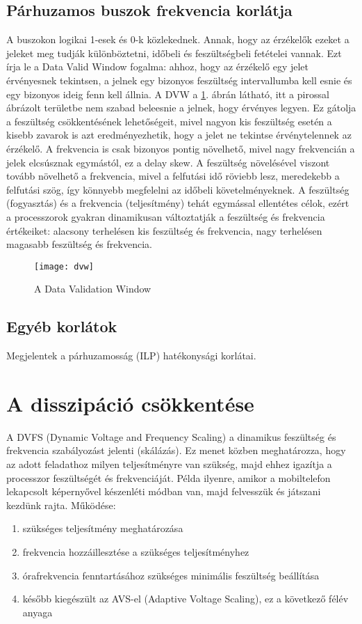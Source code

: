 \subsection{Párhuzamos buszok frekvencia korlátja}
A buszokon logikai 1-esek és 0-k közlekednek. Annak, hogy az érzékelők ezeket a jeleket meg tudják különböztetni, időbeli és feszültségbeli fetételei vannak.
Ezt írja le a Data Valid Window fogalma: ahhoz, hogy az érzékelő egy jelet érvényesnek tekintsen, a jelnek egy bizonyos feszültség intervallumba kell esnie és egy bizonyos ideig fenn kell állnia.
A DVW a \ref{fig:dvw}. ábrán látható, itt a pirossal ábrázolt területbe nem szabad beleesnie a jelnek, hogy érvényes legyen.
Ez gátolja a feszültség csökkentésének lehetőségeit, mivel nagyon kis feszültség esetén a kisebb zavarok is azt eredményezhetik, hogy a jelet ne tekintse érvénytelennek az érzékelő.
A frekvencia is csak bizonyos pontig növelhető, mivel nagy frekvencián a jelek elcsúsznak egymástól, ez a delay skew.
A feszültség növelésével viszont tovább növelhető a frekvencia, mivel a felfutási idő röviebb lesz, meredekebb a felfutási szög, így könnyebb megfelelni az időbeli követelményeknek.
A feszültség (fogyasztás) és a frekvencia (teljesítmény) tehát egymással ellentétes célok, ezért a processzorok gyakran dinamikusan változtatják a feszültség és frekvencia értékeiket: alacsony terhelésen kis feszültség és frekvencia, nagy terhelésen magasabb feszültség és frekvencia.
\begin{figure}[H]
    \texttt{[image: dvw]}
    \centering
    \caption{A Data Validation Window}
    \label{fig:dvw}
\end{figure}

\subsection{Egyéb korlátok}
Megjelentek a párhuzamosság (ILP) hatékonysági korlátai.

\section{A disszipáció csökkentése}
A DVFS (Dynamic Voltage and Frequency Scaling) a dinamikus feszültség és frekvencia szabályozást jelenti (skálázás).
Ez menet közben meghatározza, hogy az adott feladathoz milyen teljesítményre van szükség, majd ehhez igazítja a processzor feszültségét és frekvenciáját.
Példa ilyenre, amikor a mobiltelefon lekapcsolt képernyővel készenléti módban van, majd felvesszük és játszani kezdünk rajta.
Működése:
\begin{enumerate}
    \item szükséges teljesítmény meghatározása
    \item frekvencia hozzáillesztése a szükséges teljesítményhez
    \item órafrekvencia fenntartásához szükséges minimális feszültség beállítása
    \item később kiegészült az AVS-el (Adaptive Voltage Scaling), ez a következő félév anyaga
\end{enumerate}

